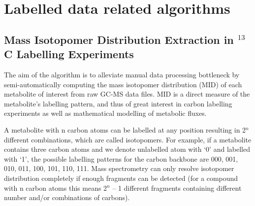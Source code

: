 

\chapter{Labelled data related algorithms}


\section
{Mass Isotopomer Distribution Extraction in $^{13}$C Labelling Experiments}


The aim of the algorithm is to alleviate manual data processing bottleneck by 
semi-automatically computing the mass isotopomer distribution (MID) of each 
metabolite of interest from raw GC-MS data files. MID is a direct measure of the
 metabolite's labelling pattern, and thus of great interest in carbon labelling 
 experiments as well as mathematical modelling of metabolic fluxes.

A metabolite with n carbon atoms can be labelled at any position resulting in
2$^{n}$ different combinations, which are called isotopomers. For example, 
if a metabolite contains three carbon atoms and we denote unlabelled atom with
 ‘0’ and labelled with ‘1’, the possible labelling patterns for the carbon 
backbone are 000, 001, 010, 011, 100, 101, 110, 111. Mass spectrometry can only
resolve isotopomer distribution completely if enough fragments can be detected 
(for a compound with n carbon atoms this means 2$^{n}$ – 1 different fragments 
containing different number and/or combinations of carbons).

